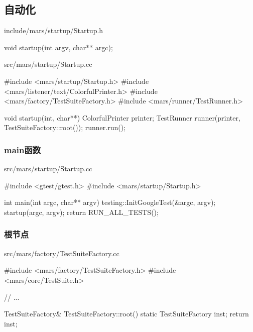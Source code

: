 \begin{content}

\subsection{自动化}

\begin{nodiff}{include/mars/startup/Startup.h}
 \begin{c++}
void startup(int argv, char** argc);
 \end{c++}
\end{nodiff}

\begin{nodiff}{src/mars/startup/Startup.cc}
 \begin{c++}
#include <mars/startup/Startup.h>
#include <mars/listener/text/ColorfulPrinter.h>
#include <mars/factory/TestSuiteFactory.h>
#include <mars/runner/TestRunner.h>

void startup(int, char**) {
  ColorfulPrinter printer;
  TestRunner runner(printer, TestSuiteFactory::root());
  runner.run();
}
 \end{c++}
\end{nodiff}

\subsubsection{main函数}

\begin{nodiff}{src/mars/startup/Startup.cc}
 \begin{c++}
#include <gtest/gtest.h>
#include <mars/startup/Startup.h>

int main(int argc, char** argv) {
  testing::InitGoogleTest(&argc, argv);
  startup(argc, argv);
  return RUN_ALL_TESTS();
}
 \end{c++}
\end{nodiff}

\subsubsection{根节点}

\begin{nodiff}{src/mars/factory/TestSuiteFactory.cc}
 \begin{c++}
#include <mars/factory/TestSuiteFactory.h>
#include <mars/core/TestSuite.h>

// ...

TestSuiteFactory& TestSuiteFactory::root() {
  static TestSuiteFactory inst;
  return inst;
}
 \end{c++}
\end{nodiff}


\end{content}
